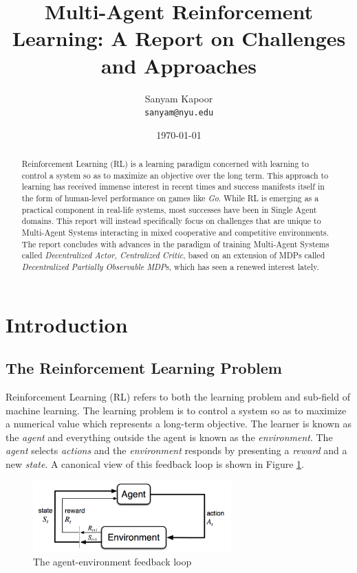 \documentclass[12pt,a4paper]{article}
\title{\textbf{Multi-Agent Reinforcement Learning: A Report on Challenges and Approaches}}
\author{Sanyam Kapoor\\ \texttt{sanyam@nyu.edu}}
\date{\today}
\begin{document}
\maketitle

\begin{abstract}
Reinforcement Learning (RL) is a learning paradigm concerned with learning to control a system 
so as to maximize an objective over the long term. This approach to learning has received
immense interest in recent times and success manifests itself in the form of human-level 
performance on games like \textit{Go}. While RL is emerging as a practical component in
real-life systems, most successes have been in Single Agent domains. This report will
instead specifically focus on challenges that are unique to Multi-Agent Systems interacting
in mixed cooperative and competitive environments. The report concludes with advances in the
paradigm of training Multi-Agent Systems called \textit{Decentralized Actor, Centralized Critic}, 
based on an extension of MDPs called \textit{Decentralized Partially Observable MDP}s, which 
has seen a renewed interest lately.
\end{abstract}

\cleardoublepage
\tableofcontents
\listoffigures

\cleardoublepage
\section{Introduction}

\subsection{The Reinforcement Learning Problem}

Reinforcement Learning (RL) refers to both the learning problem and sub-field of machine 
learning. The learning problem is to control a system so as to maximize a numerical value which 
represents a long-term objective. The learner is known as the \textit{agent} and everything 
outside the agent is known as the \textit{environment}. The \textit{agent} selects \textit{actions}
and the \textit{environment} responds by presenting a \textit{reward} and a new \textit{state}. A
canonical view of this feedback loop is shown in Figure \ref{fig:agent_environment_feedback}.

\begin{figure}[ht]
\centering
\includegraphics[width=3in]{agent-environment-feedback}
\caption{The agent-environment feedback loop \cite{Sutton:1998:IRL:551283}} \label{fig:agent_environment_feedback}
\end{figure}
\end{document}
